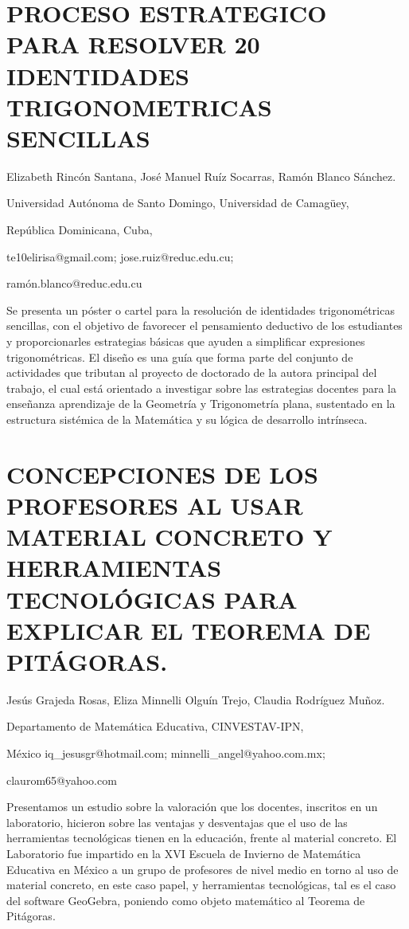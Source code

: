 \section{PROCESO ESTRATEGICO PARA RESOLVER 20 IDENTIDADES TRIGONOMETRICAS
SENCILLAS }

\begin{datos}

Elizabeth Rincón Santana, José Manuel Ruíz Socarras, Ramón Blanco
Sánchez.

Universidad Autónoma de Santo Domingo, Universidad de Camagüey,

República Dominicana, Cuba,

te10elirisa@gmail.com; jose.ruiz@reduc.edu.cu;

ramón.blanco@reduc.edu.cu

\end{datos}

Se presenta un póster o cartel para la resolución de identidades trigonométricas
sencillas, con el objetivo de favorecer el pensamiento deductivo de
los estudiantes y proporcionarles estrategias básicas que ayuden a
simplificar expresiones trigonométricas. El diseño es una guía que
forma parte del conjunto de actividades que tributan al proyecto de
doctorado de la autora principal del trabajo, el cual está orientado
a investigar sobre las estrategias docentes para la enseñanza aprendizaje
de la Geometría y Trigonometría plana, sustentado en la estructura
sistémica de la Matemática y su lógica de desarrollo intrínseca.


\section{CONCEPCIONES DE LOS PROFESORES AL USAR MATERIAL CONCRETO Y HERRAMIENTAS
TECNOLÓGICAS PARA EXPLICAR EL TEOREMA DE PITÁGORAS. }

\begin{datos}

Jesús Grajeda Rosas, Eliza Minnelli Olguín Trejo, Claudia Rodríguez
Muñoz.

Departamento de Matemática Educativa, CINVESTAV-IPN,

México iq\_jesusgr@hotmail.com; minnelli\_angel@yahoo.com.mx;

claurom65@yahoo.com

\end{datos}

Presentamos un estudio sobre la valoración que los docentes, inscritos
en un laboratorio, hicieron sobre las ventajas y desventajas que el uso
de las herramientas tecnológicas tienen en la educación, frente al
material concreto. El Laboratorio fue impartido en la XVI Escuela
de Invierno de Matemática Educativa en México a un grupo de profesores
de nivel medio en torno al uso de material concreto, en este caso
papel, y herramientas tecnológicas, tal es el caso del software GeoGebra,
poniendo como objeto matemático al Teorema de Pitágoras. 


